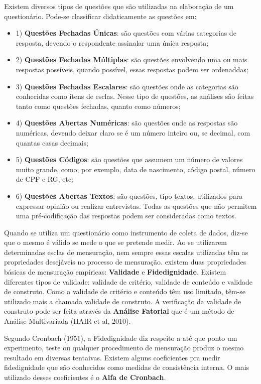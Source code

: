 \inic Existem diversos tipos de questões que são utilizadas na elaboração de um questionário. Pode-se classificar didaticamente as questões em:


\begin{itemize}
\item{1)} \textbf{Questões Fechadas Únicas}: são questões com várias categorias de resposta, devendo o respondente assinalar uma única resposta;
\item{2)} \textbf{Questões Fechadas Múltiplas}: são questões envolvendo uma ou mais respostas possíveis, quando possível, essas respostas podem ser ordenaddas;
\item{3)} \textbf{ Questões Fechadas Escalares}: são questões onde  as categorias são conhecidas como itens de esclas. Nesse tipo de questões, as análises são feitas tanto como questões fechadas, quanto como números;
\item{4)} \textbf{ Questões Abertas Numéricas}: são questões onde as respostas são numéricas, devendo deixar claro se é um número inteiro ou, se decimal, com quantas casas decimais;
\item{5)} \textbf{ Questões Códigos}: são questões que assumem  um número de valores muito grande, como, por exemplo, data de nascimento, código postal, número de CPF e RG, etc;
\item{6)} \textbf{ Questões Abertas Textos}: são questões, tipo textos, utilizados para expressar opinião ou realizar entrevistas. Todas as questões que não permitem uma pré-codificação das respostas podem ser consideradas como textos.
\end{itemize}



\inic Quando se utiliza um questionário como instrumento de coleta de dados, diz-se que o mesmo é válido se mede o que se pretende medir. Ao se utilizarem determinadas esclas de mensuração, nem sempre essas escalas utilizadas têm as propriedades desejáveis no processo de mensuração. existem duas propriedades básicas de mensuração empíricas: \textbf{Validade} e \textbf{Fidedignidade}. Existem diferentes tipos de validade: validade de critério, validade de conteúdo e validade de construto. Como a validade de critério e conteúdo têm uso limitado, têm-se utilizado mais a chamada validade de construto. A verificação da validade de construto pode ser feita através da \textbf{Análise Fatorial} que é um método de Análise Multivariada (HAIR et al, 2010).\vskip0.3cm

\inic Segundo Cronbach (1951), a Fidedignidade diz respeito a até que ponto um experimento, teste ou qualquer procedimento de mensuração produz o mesmo resultado em diversas tentaivas. Existem alguns coeficientes pra medir fidedignidade que são conhecidos como medidas de consistência interna. O mais utilizado desses coeficientes é o \textbf{Alfa de Cronbach}.  \vskip0.3cm

